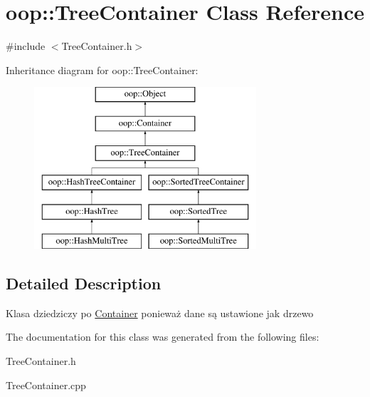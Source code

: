 \hypertarget{classoop_1_1TreeContainer}{\section{oop\-:\-:\-Tree\-Container \-Class \-Reference}
\label{classoop_1_1TreeContainer}
}


{\ttfamily \#include $<$\-Tree\-Container.\-h$>$}

\-Inheritance diagram for oop\-:\-:\-Tree\-Container\-:\begin{figure}[H]
\begin{center}
\leavevmode
\includegraphics[height=6.000000cm]{classoop_1_1TreeContainer}
\end{center}
\end{figure}


\subsection{\-Detailed \-Description}
\-Klasa dziedziczy po \hyperlink{classoop_1_1Container}{\-Container} ponieważ dane są ustawione jak drzewo 

\-The documentation for this class was generated from the following files\-:\begin{DoxyCompactItemize}
\item 
\-Tree\-Container.\-h\item 
\-Tree\-Container.\-cpp\end{DoxyCompactItemize}
